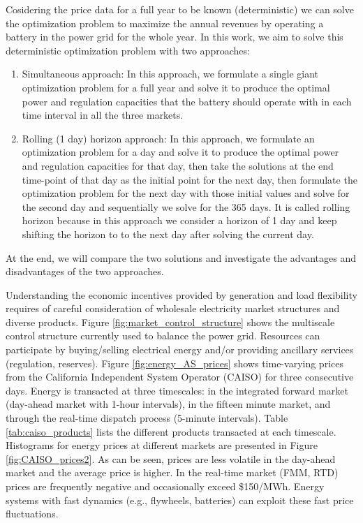 \documentclass[11pt,twoside]{article}
\begin{document}
Cosidering the price data for a full year to be known (deterministic) we can solve the optimization problem to maximize the annual revenues by operating a battery in the power grid for the whole year. In this work, we aim to solve this deterministic optimization problem with two approaches:
\begin{enumerate}
\item Simultaneous approach: In this approach, we formulate a single giant optimization problem for a full year and solve it to produce the optimal power and regulation capacities that the battery should operate with in each time interval in all the three markets. 
\item Rolling (1 day) horizon approach: In this approach, we formulate an optimization problem for a day and solve it to produce the optimal power and regulation capacities for that day, then take the solutions at the end time-point of that day as the initial point for the next day, then formulate the optimization problem for the next day with those initial values and solve for the second day and sequentially we solve for the 365 days. It is called rolling horizon because in this approach we consider a horizon of 1 day and keep shifting the horizon to to the next day after solving the current day.
\end{enumerate}

At the end, we will compare the two solutions and investigate the advantages and disadvantages of the two approaches.

Understanding the economic incentives provided by generation and load flexibility requires of careful consideration of wholesale electricity market structures and diverse products. Figure \ref{fig:market_control_structure} shows the multiscale control structure currently used to balance the power grid. Resources can participate by buying/selling electrical energy and/or providing ancillary services (regulation, reserves). Figure \ref{fig:energy_AS_prices} shows time-varying prices from the California Independent System Operator (CAISO) for three consecutive days. Energy is transacted at three timescales: in the integrated forward market (day-ahead market with 1-hour intervals), in the fifteen minute market, and through the real-time dispatch process (5-minute intervals). Table \ref{tab:caiso_products} lists the different products transacted at each timescale. Histograms for energy prices at different markets are presented in Figure \ref{fig:CAISO_prices2}. As can be seen, prices are less volatile in the day-ahead market and the average price is higher. In the real-time market (FMM, RTD) prices are frequently negative and occasionally exceed \$150/MWh. Energy systems with fast dynamics (e.g., flywheels, batteries) can exploit these fast price fluctuations.
\end{document}
